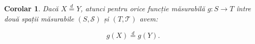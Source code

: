 \documentclass[12pt]{article}
\theoremstyle{plain}
\newtheorem{corollary}{Corolar}
\begin{document}
\begin{corollary}
Dacă $X \overset{d}{=} Y$, atunci pentru orice funcție măsurabilă
$g : S \to T$ între două spații măsurabile $(S, \mathscr{S})$ și
$(T, \mathcal{T})$ avem:


\[
g(X) \overset{d}{=} g(Y).
\]


\end{corollary}
\end{document}
